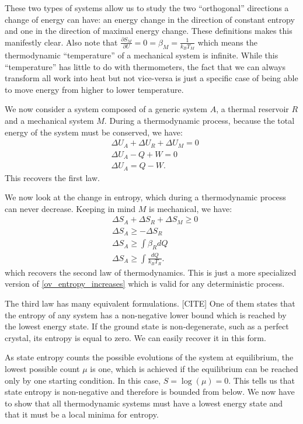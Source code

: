 \documentclass[letterpaper,twocolumn]{article}
\begin{document}
These two types of systems allow us to study the two ``orthogonal'' directions a change of energy can have: an energy change in the direction of constant entropy and one in the direction of maximal energy change. These definitions makes this manifestly clear. Also note that $\frac{\partial S_M}{\partial U} = 0 = \beta_M = \frac{1}{k_B T_M}$ which means the thermodynamic ``temperature'' of a mechanical system is infinite. While this ``temperature'' has little to do with thermometers, the fact that we can always transform all work into heat but not vice-versa is just a specific case of being able to move energy from higher to lower temperature.

We now consider a system composed of a generic system $A$, a thermal reservoir $R$ and a mechanical system $M$. During a thermodynamic process, because the total energy of the system must be conserved, we have:
\begin{equation}
\begin{aligned}
&\Delta U_A + \Delta U_R + \Delta U_M = 0 \\
&\Delta U_A - Q + W = 0 \\
&\Delta U_A = Q - W.
\end{aligned}
\end{equation}
This recovers the first law.

We now look at the change in entropy, which during a thermodynamic process can never decrease. Keeping in mind $M$ is mechanical, we have:
\begin{equation}
\begin{aligned}
&\Delta S_A + \Delta S_R + \Delta S_M \geq 0 \\
&\Delta S_A \geq - \Delta S_R \\
&\Delta S_A \geq \int \beta_R dQ \\
&\Delta S_A \geq \int \frac{dQ}{k_B T_R}.
\end{aligned}
\end{equation}
which recovers the second law of thermodynamics. This is just a more specialized version of \eqref{ov_entropy_increases} which is valid for any deterministic process.

The third law has many equivalent formulations. [CITE] One of them states that the entropy of any system has a non-negative lower bound which is reached by the lowest energy state. If the ground state is non-degenerate, such as a perfect crystal, its entropy is equal to zero. We can easily recover it in this form.

As state entropy counts the possible evolutions of the system at equilibrium, the lowest possible count $\mu$ is one, which is achieved if the equilibrium can be reached only by one starting condition. In this case, $S=\log(\mu)=0$. This tells us that state entropy is non-negative and therefore is bounded from below. We now have to show that all thermodynamic systems must have a lowest energy state and that it must be a local minima for entropy.
\end{document}
